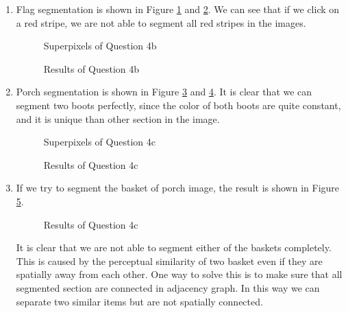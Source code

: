 \documentclass[12pt]{article}
\begin{document}
\begin{enumerate}
\begin{enumerate}
	\item Flag segmentation is shown in Figure \ref{fig:q4_2_1} and \ref{fig:q4_2_2}. We can see that if we click on a red stripe, we are not able to segment all red stripes in the images.
	\begin{figure}[H]
		\centering{}
		\caption{Superpixels of Question 4b}
		\label{fig:q4_2_1}
	\end{figure}
	\begin{figure}[H]
		\centering{}
		\caption{Results of Question 4b}
		\label{fig:q4_2_2}
	\end{figure}

	\item Porch segmentation is shown in Figure \ref{fig:q4_3_1} and \ref{fig:q4_3_2}. It is clear that we can segment two boots perfectly, since the color of both boots are quite constant, and it is unique than other section in the image.
	\begin{figure}[H]
		\centering{}
		\caption{Superpixels of Question 4c}
		\label{fig:q4_3_1}
	\end{figure}
	\begin{figure}[H]
		\centering{}
		\caption{Results of Question 4c}
		\label{fig:q4_3_2}
	\end{figure}

	\item If we try to segment the basket of porch image, the result is shown in Figure \ref{fig:q4_4}. 
	\begin{figure}[H]
		\centering{}
		\caption{Results of Question 4c}
		\label{fig:q4_4}
	\end{figure}
	It is clear that we are not able to segment either of the baskets completely. This is caused by the perceptual similarity of two basket even if they are spatially away from each other. One way to solve this is to make sure that all segmented section are connected in adjacency graph. In this way we can separate two similar items but are not spatially connected.   
	
		
	\end{enumerate}
	\end{enumerate}
\pagebreak
\end{document}
